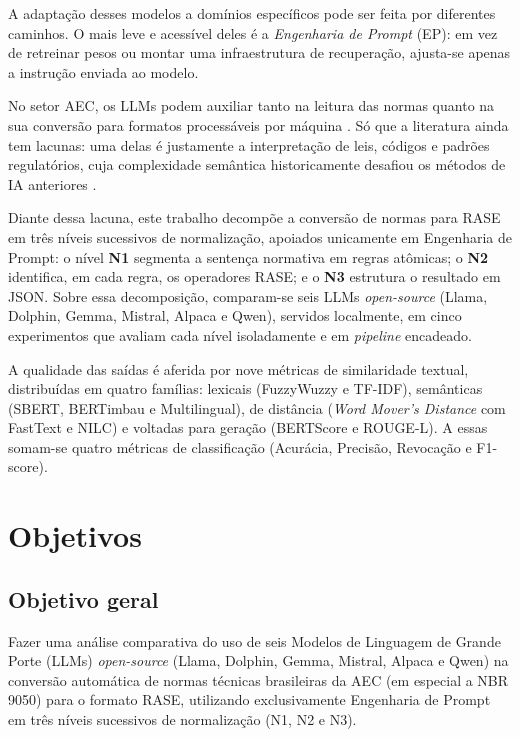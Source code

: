 A adaptação desses modelos a domínios específicos pode ser feita por diferentes caminhos. O mais leve e acessível deles é a \textit{Engenharia de Prompt} (EP): em vez de retreinar pesos ou montar uma infraestrutura de recuperação, ajusta-se apenas a instrução enviada ao modelo.

No setor AEC, os LLMs podem auxiliar tanto na leitura das normas quanto na sua conversão para formatos processáveis por máquina \cite{fuchs2024}. Só que a literatura ainda tem lacunas: uma delas é justamente a interpretação de leis, códigos e padrões regulatórios, cuja complexidade semântica historicamente desafiou os métodos de IA anteriores \cite{fuchs2024}.

Diante dessa lacuna, este trabalho decompõe a conversão de normas para RASE em três níveis sucessivos de normalização, apoiados unicamente em Engenharia de Prompt: o nível \textbf{N1} segmenta a sentença normativa em regras atômicas; o \textbf{N2} identifica, em cada regra, os operadores RASE; e o \textbf{N3} estrutura o resultado em JSON. Sobre essa decomposição, comparam-se seis LLMs \textit{open-source} (Llama, Dolphin, Gemma, Mistral, Alpaca e Qwen), servidos localmente, em cinco experimentos que avaliam cada nível isoladamente e em \textit{pipeline} encadeado.

A qualidade das saídas é aferida por nove métricas de similaridade textual, distribuídas em quatro famílias: lexicais (FuzzyWuzzy e TF-IDF), semânticas (SBERT, BERTimbau e Multilingual), de distância (\textit{Word Mover's Distance} com FastText e NILC) e voltadas para geração (BERTScore e ROUGE-L). A essas somam-se quatro métricas de classificação (Acurácia, Precisão, Revocação e F1-score).


\section{Objetivos}

\subsection*{Objetivo geral}

Fazer uma análise comparativa do uso de seis Modelos de Linguagem de Grande Porte (LLMs) \textit{open-source} (Llama, Dolphin, Gemma, Mistral, Alpaca e Qwen) na conversão automática de normas técnicas brasileiras da AEC (em especial a NBR 9050) para o formato RASE, utilizando exclusivamente Engenharia de Prompt em três níveis sucessivos de normalização (N1, N2 e N3).


